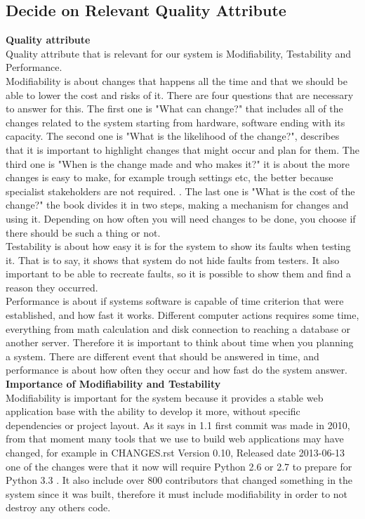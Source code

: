 \documentclass[12pt,a4paper]{article}
\begin{document}
\subsection{Decide on Relevant Quality Attribute}
\textbf{Quality attribute}\\
Quality attribute that is relevant for our system is Modifiability, Testability and Performance. \\ Modifiability is about changes that happens all the time and that we should be able to lower the cost and risks of it. There are four questions that are necessary to answer for this. The first one is "What can change?" that includes all of the changes related to the system starting from hardware, software ending with its capacity. \cite[8]{SAP} The second one is "What is the likelihood of the change?", describes that it is important to highlight changes that might occur and plan for them. The third one is "When is the change made and who makes it?" it is about the more changes is easy to make, for example trough settings etc, the better because specialist stakeholders are not required. \cite[8]{SAP}. The last one is "What is the cost of the change?" the book divides it in two steps, making a mechanism for changes and using it. Depending on how often you will need changes to be done, you choose if there should be such a thing or not. \cite[8]{SAP} \\
Testability is about how easy it is for the system to show its faults when testing it. That is to say, it shows that system do not hide faults from testers. It also important to be able to recreate faults, so it is possible to show them and find a reason they occurred. \cite[12]{SAP}\\
Performance is about if systems software is capable of time criterion that were established, and how fast it works. Different computer actions requires some time, everything from math calculation and disk connection  to reaching a database or another server. Therefore it is important to think about time when you planning a system. There are different event that should be answered in time, and performance is about how often they occur and how fast do the system answer. \cite[9]{SAP}\\
\textbf{Importance of Modifiability and Testability}\\
 Modifiability is important for the system because it provides a stable web application base with the ability to develop it more, without specific dependencies or project layout. \cite{flaskgit} As it says in 1.1 first commit was made in 2010, from that moment many tools that we use to build web applications may have changed, for example in CHANGES.rst Version 0.10, Released date 2013-06-13 one of the changes were that it now will require Python 2.6 or 2.7 to prepare for Python 3.3 \cite{flaskgit}. It also include over 800 contributors that changed something in the system since it was built, therefore it must include modifiability in order to not destroy any others code.\\
\end{document}
